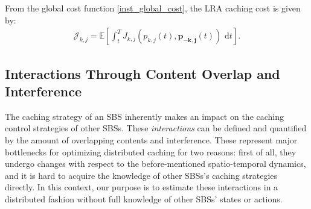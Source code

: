 \documentclass{book}
\begin{document}
     From the global cost function \eqref{inst_global_cost}, the LRA caching cost is given by:
    \begin{align}
    \mathcal{J}_{k,j} = \mathbb{E} \left[\int_t^T J_{k,j}(p_{k,j}(t),\boldsymbol{p_{-k,j}}(t)) \text{ d}t \right]. \label{LRA cost}
    \end{align}
    
    \subsection{Interactions Through Content Overlap and Interference}
    
    The caching strategy of an SBS inherently makes an impact on the caching control strategies of other SBSs. These {\it interactions} can be defined and quantified by the amount of overlapping contents and interference. These represent major bottlenecks for optimizing distributed caching for two reasons: first of all, they undergo changes with respect to the before-mentioned spatio-temporal dynamics, and it is hard to acquire the knowledge of other SBSs's caching strategies directly.
    In this context, our purpose is to estimate these interactions in a distributed fashion without full knowledge of other SBSs' states or actions. 
    
\end{document}
